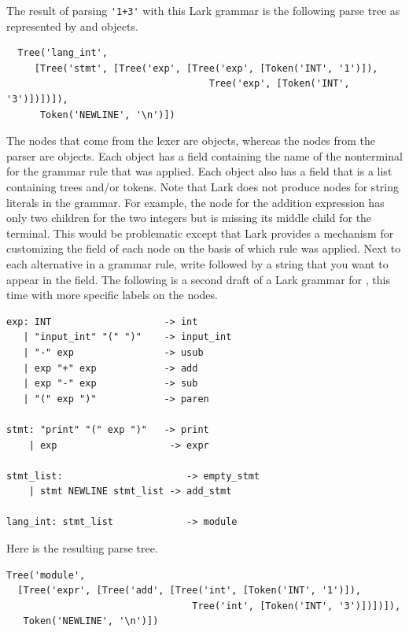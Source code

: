 \documentclass[7x10]{TimesAPriori_MIT}%
\numberwithin{theorem}{chapter}
\numberwithin{definition}{chapter}
\numberwithin{equation}{chapter}
\begin{document}
{The result of parsing \lstinline{'1+3'} with this Lark grammar is the
following parse tree as represented by  and 
objects.
\begin{lstlisting}
  Tree('lang_int',
     [Tree('stmt', [Tree('exp', [Tree('exp', [Token('INT', '1')]),
                                    Tree('exp', [Token('INT', '3')])])]),
      Token('NEWLINE', '\n')])
\end{lstlisting}
The nodes that come from the lexer are  objects, whereas
the nodes from the parser are  objects.  Each 
object has a  field containing the name of the nonterminal
for the grammar rule that was applied. Each  object also
has a  field that is a list containing trees and/or
tokens. Note that Lark does not produce nodes for string literals in
the grammar. For example, the  node for the addition
expression has only two children for the two integers but is missing
its middle child for the  terminal. This would be
problematic except that Lark provides a mechanism for customizing the
 field of each  node on the basis of which rule was
applied.  Next to each alternative in a grammar rule, write \code{->}
followed by a string that you want to appear in the 
field.  The following is a second draft of a Lark grammar for
\LangInt{}, this time with more specific labels on the 
nodes.
\begin{center}
\begin{minipage}{0.95\textwidth}
\begin{lstlisting}[escapechar=$]
exp: INT                    -> int
   | "input_int" "(" ")"    -> input_int
   | "-" exp                -> usub
   | exp "+" exp            -> add
   | exp "-" exp            -> sub
   | "(" exp ")"            -> paren

stmt: "print" "(" exp ")"   -> print
    | exp                    -> expr

stmt_list:                      -> empty_stmt
    | stmt NEWLINE stmt_list -> add_stmt

lang_int: stmt_list             -> module
\end{lstlisting}
\end{minipage}
\end{center}
Here is the resulting parse tree. 
\begin{lstlisting}
Tree('module',
  [Tree('expr', [Tree('add', [Tree('int', [Token('INT', '1')]),
                                 Tree('int', [Token('INT', '3')])])]),
   Token('NEWLINE', '\n')])
\end{lstlisting}

}
\end{document}
